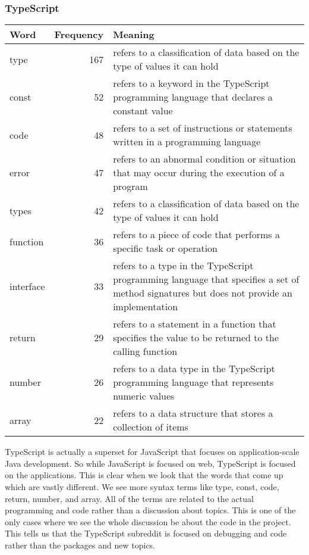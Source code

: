 \documentclass{article}
\theoremstyle{theorem}
\theoremstyle{definition}
\theoremstyle{remark}
\begin{document}
\subsubsection{TypeScript}
\begin{tabular}{ | l | r | p{7cm} | }
\hline
Word & Frequency & Meaning \\
\hline
type & 167 & refers to a classification of data based on the type of values it can hold \\
\hline
const & 52 & refers to a keyword in the TypeScript programming language that declares a constant value \\
\hline
code & 48 & refers to a set of instructions or statements written in a programming language \\
\hline
error & 47 & refers to an abnormal condition or situation that may occur during the execution of a program \\
\hline
types & 42 & refers to a classification of data based on the type of values it can hold \\
\hline
function & 36 & refers to a piece of code that performs a specific task or operation \\
\hline
interface & 33 & refers to a type in the TypeScript programming language that specifies a set of method signatures but does not provide an implementation \\
\hline
return & 29 & refers to a statement in a function that specifies the value to be returned to the calling function \\
\hline
number & 26 & refers to a data type in the TypeScript programming language that represents numeric values \\
\hline
array & 22 & refers to a data structure that stores a collection of items \\
\hline
\end{tabular}

\medskip
TypeScript is actually a superset for JavaScript that focuses on application-scale Java development. So while JavaScript is focused on web, TypeScript is focused on the applications. This is clear when we look that the words that come up which are vastly different. We see more syntax terms like type, const, code, return, number, and array. All of the terms are related to the actual programming and code rather than a discussion about topics. 
This is one of the only cases where we see the whole discussion be about the code in the project. This tells us that the TypeScript subreddit is focused on debugging and code rather than the packages and new topics.
\end{document}
